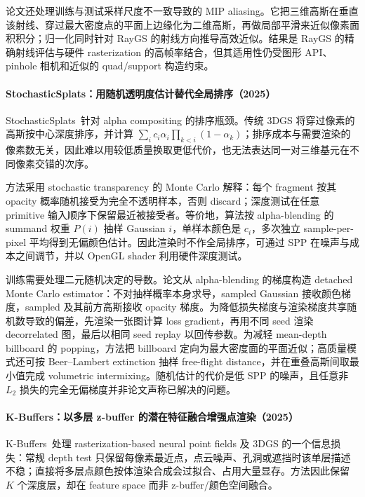论文还处理训练与测试采样尺度不一致导致的 MIP aliasing。它把三维高斯在垂直该射线、穿过最大密度点的平面上边缘化为二维高斯，再做局部平滑来近似像素面积积分；归一化同时针对 RayGS 的射线方向推导高效近似。结果是 RayGS 的精确射线评估与硬件 rasterization 的高帧率结合，但其适用性仍受图形 API、pinhole 相机和近似的 quad/support 构造约束。

\paragraph{StochasticSplats：用随机透明度估计替代全局排序（2025）\cite{2503_24366}}
StochasticSplats~\cite{2503_24366}针对 alpha compositing 的排序瓶颈。传统 3DGS 将穿过像素的高斯按中心深度排序，并计算 $\sum_i c_i\alpha_i\prod_{k<i}(1-\alpha_k)$；排序成本与需要渲染的像素数无关，因此难以用较低质量换取更低代价，也无法表达同一对三维基元在不同像素交错的次序。

方法采用 stochastic transparency 的 Monte Carlo 解释：每个 fragment 按其 opacity 概率随机接受为完全不透明样本，否则 discard；深度测试在任意 primitive 输入顺序下保留最近被接受者。等价地，算法按 alpha-blending 的 summand 权重 $P(i)$ 抽样 Gaussian $i$，单样本颜色是 $c_i$，多次独立 sample-per-pixel 平均得到无偏颜色估计。因此渲染时不作全局排序，可通过 SPP 在噪声与成本之间调节，并以 OpenGL shader 利用硬件深度测试。

训练需要处理二元随机决定的导数。论文从 alpha-blending 的梯度构造 detached Monte Carlo estimator：不对抽样概率本身求导，sampled Gaussian 接收颜色梯度，sampled 及其前方高斯接收 opacity 梯度。为降低损失梯度与渲染梯度共享随机数导致的偏差，先渲染一张图计算 loss gradient，再用不同 seed 渲染 decorrelated 图，最后以相同 seed replay 以回传参数。为减轻 mean-depth billboard 的 popping，方法把 billboard 定向为最大密度面的平面近似；高质量模式还可按 Beer--Lambert extinction 抽样 free-flight distance，并在重叠高斯间取最小值完成 volumetric intermixing。随机估计的代价是低 SPP 的噪声，且任意非 $L_2$ 损失的完全无偏梯度并非论文声称已解决的问题。

\paragraph{K-Buffers：以多层 z-buffer 的潜在特征融合增强点渲染（2025）\cite{2505_19564}}
K-Buffers~\cite{2505_19564}处理 rasterization-based neural point fields 及 3DGS 的一个信息损失：常规 depth test 只保留每像素最近点，点云噪声、孔洞或遮挡时该单层描述不稳；直接将多层点颜色按体渲染合成会过拟合、占用大量显存。方法因此保留 $K$ 个深度层，却在 feature space 而非 z-buffer/颜色空间融合。

